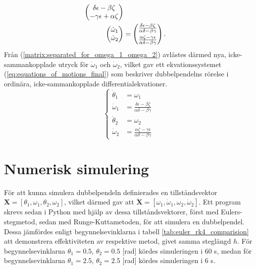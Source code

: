 \begin{align}
\begin{pmatrix}
        \delta\epsilon - \beta\zeta \\
        -\gamma\epsilon + \alpha\zeta
    \end{pmatrix} \notag \\ %
    \begin{pmatrix}
        \dot{\omega}_1 \\
        \dot{\omega}_2
    \end{pmatrix}
    &= 
    \begin{pmatrix}
        \frac{\delta\epsilon - \beta\zeta}{\alpha\delta - \beta\gamma} \vspace{1mm}\\
        \frac{\alpha\zeta - \gamma\epsilon}{\alpha\delta - \beta\gamma}
    \end{pmatrix}. \label{matrix:separated_for_omega_1_omega_2}
\end{align}
Från (\ref{matrix:separated_for_omega_1_omega_2}) avlästes därmed nya, icke-sammankopplade utryck för $\dot{\omega}_1$ och $\dot{\omega}_2$, vilket gav ett ekvationssystemet (\ref{eq:equations_of_motions_final}) som beskriver dubbelpendelns rörelse i ordinära, icke-sammankopplade differentialekvationer.
\begin{equation}
    \begin{cases}
        \dot{\theta}_1 &= \omega_1 \\
        \dot{\omega}_1 &= \frac{\delta\epsilon - \beta\zeta}{\alpha\delta - \beta\gamma} \\
        \dot{\theta}_2 &= \omega_2 \\
        \dot{\omega}_2 &= \frac{\alpha\zeta - \gamma\epsilon}{\alpha\delta - \beta\gamma}
    \end{cases} \label{eq:equations_of_motions_final}
\end{equation}

\section{Numerisk simulering} \label{section:numeriska_metoder}
För att kunna simulera dubbelpendeln definierades en tillståndsvektor \\$\mathbf{X} = [\theta_1, \omega_1, \theta_2, \omega_2]$, vilket därmed gav att $\dot{\mathbf{X}} = [\omega_1, \dot{\omega}_1, \omega_2, \dot{\omega}_2]$. Ett program skrevs sedan i Python med hjälp av dessa tillståndsvektorer, först med Eulers-stegmetod, sedan med Runge-Kuttametoden, för att simulera en dubbelpendel. Dessa jämfördes enligt begynnelsevinklarna i tabell \ref{tab:euler_rk4_comparision} att demonstrera effektiviteten av respektive metod, givet samma steglängd $h$. För begynnelsevinklarna $\theta_1 = 0.5$, $\theta_2 = 0.5$ [rad] kördes simuleringen i 60 s, medan för begynnelsevinklarna $\theta_1 = 2.5$, $\theta_2 = 2.5$ [rad] kördes simuleringen i 6 s. 

